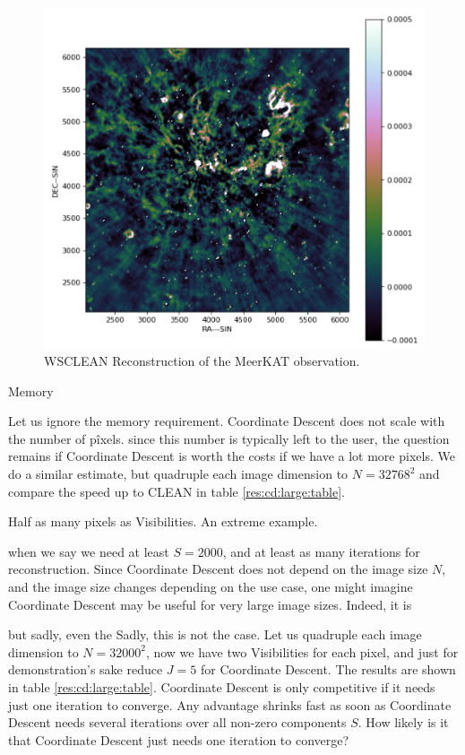 \begin{figure}[h]
	\centering
	\includegraphics[width=0.6\linewidth]{./chapters/20.results/meerkat.png}
	\caption{WSCLEAN Reconstruction of the MeerKAT observation.}
	\label{results:wsclean}
\end{figure}


Memory


Let us ignore the memory requirement. Coordinate Descent does not scale with the number of pîxels. since this number is typically left to the user, the question remains if Coordinate Descent is worth the costs if we have a lot more pixels. We do a similar estimate, but quadruple each image dimension to $N=32768^2$ and compare the speed up to CLEAN in table \ref{res:cd:large:table}. 

Half as many pixels as Visibilities. An extreme example.


   when we say we need at least $S=2000$, and at least as many iterations for reconstruction. Since Coordinate Descent does not depend on the image size $N$, and the image size changes depending on the use case, one might imagine Coordinate Descent may be useful for very large image sizes. Indeed, it is

   but sadly, even the  Sadly, this is not the case. Let us quadruple each image dimension to $N=32000^2$, now we have two Visibilities for each pixel, and just for demonstration's sake reduce $J=5$ for Coordinate Descent. The results are shown in table \ref{res:cd:large:table}. Coordinate Descent is only competitive if it needs just one iteration to converge. Any advantage shrinks fast as soon as Coordinate Descent needs several iterations over all non-zero components $S$. How likely is it that Coordinate Descent just needs one iteration to converge?


